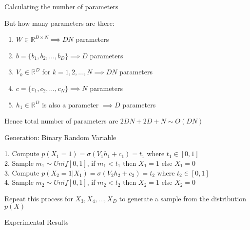 \begin{frame}{Calculating the number of parameters}
    
    But how many parameters are there:

    \begin{enumerate}
        \item $W \in \mathbb{R}^{D \times N} \implies DN $ parameters
        \item $b = \{b_1,b_2,...,b_D\} \implies D$ parameters
        \item $V_k \in \mathbb{R}^{D}$ for $k=1,2,...,N \implies DN$ parameters
        \item $c = \{c_1,c_2,...,c_N\} \implies N$ parameters
        \item $h_1 \in \mathbb{R}^D$ is also a parameter $\implies D$ parameters
    \end{enumerate}

    \bigskip
    
    Hence total number of parameters are $2DN + 2D + N \sim O(DN)$
    
\end{frame}

\begin{frame}{Generation: Binary Random Variable}

    1. Compute $p(X_1=1) = \sigma(V_1h_1 + c_1) = t_1$ where $t_1 \in [0,1]$ \\
    2. Sample $m_1 \sim Unif[0,1]$, if $m_1 < t_1$ then $X_1 = 1$ else $X_1 = 0$ \\
    3. Compute $p(X_2=1|X_1) = \sigma(V_2h_2 + c_2) = t_2$ where $t_2 \in [0,1]$ \\
    4. Sample $m_2 \sim Unif[0,1]$, if $m_2 < t_2$ then $X_2 = 1$ else $X_2 = 0$ \\

    \bigskip

    Repeat this process for $X_3,X_4,...,X_D$ to generate a sample from the distribution $p(X)$

\end{frame}

\begin{frame}{Experimental Results}
    
\end{frame}
